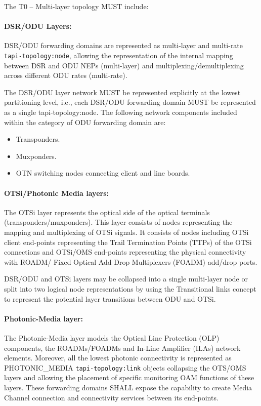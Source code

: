 \documentclass[a4paper,fleqn]{cas-dc}
\begin{document}
The T0 – Multi-layer topology MUST include:

\paragraph{DSR/ODU Layers:}
DSR/ODU forwarding domains are represented as multi-layer and multi-rate \texttt{tapi-topology:node}, allowing the representation of the internal mapping between DSR and ODU NEPs (multi-layer) and multiplexing/demultiplexing across different ODU rates (multi-rate). 

The DSR/ODU layer network MUST be represented explicitly at the lowest partitioning level, i.e., each DSR/ODU forwarding domain MUST be represented as a single tapi-topology:node. The following network components included within the category of ODU forwarding domain are:

\begin{itemize}
    \item Transponders.
    \item Muxponders.
    \item OTN switching nodes connecting client and line boards.
\end{itemize}

\paragraph{OTSi/Photonic Media layers:}
The OTSi layer represents the optical side of the optical terminals (transponders/muxponders). This layer consists of nodes representing the mapping and multiplexing of OTSi signals. It consists of nodes including OTSi client end-points representing the Trail Termination Points (TTPs) of the OTSi connections and OTSi/OMS end-points representing the physical connectivity with ROADM/ Fixed Optical Add Drop Multiplexers (FOADM) add/drop ports.

DSR/ODU and OTSi layers may be collapsed into a single multi-layer node or split into two logical node representations by using the Transitional links concept to represent the potential layer transitions between ODU and OTSi.

\paragraph{Photonic-Media layer:}
The Photonic-Media layer models the Optical Line Protection (OLP) components, the ROADMs/FOADMs and In-Line Amplifier (ILAs) network elements. Moreover, all the lowest photonic connectivity is represented as PHOTONIC\_MEDIA \texttt{tapi-topology:link} objects collapsing the OTS/OMS layers and allowing the placement of specific monitoring OAM functions of these layers. These forwarding domains SHALL expose the capability to create Media Channel connection and connectivity services between its end-points.
\end{document}

